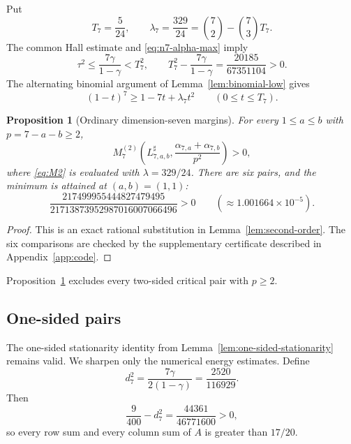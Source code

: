 \documentclass[11pt,a4paper]{article}
\numberwithin{equation}{section}
\newtheorem{proposition}[theorem]{Proposition}
\theoremstyle{definition}
\newcommand{\1}{\mathbf{1}}
\begin{document}
Put
\begin{equation}\label{eq:n7-ordinary-parameters}
 T_7=\frac5{24},
 \qquad
 \lambda_7=\frac{329}{24}
 =\binom72-\binom73T_7.
\end{equation}
The common Hall estimate and \eqref{eq:n7-alpha-max} imply
\begin{equation}\label{eq:n7-ordinary-range}
 \tau^2\le\frac{7\gamma}{1-\gamma}<T_7^2,
 \qquad
 T_7^2-\frac{7\gamma}{1-\gamma}
 =\frac{20185}{67351104}>0.
\end{equation}
The alternating binomial argument of Lemma~\ref{lem:binomial-low} gives
\begin{equation}\label{eq:n7-ordinary-binomial}
 (1-t)^7\ge1-7t+\lambda_7t^2
 \qquad(0\le t\le T_7).
\end{equation}

\begin{proposition}[Ordinary dimension-seven margins]\label{prop:n7-ordinary}
For every $1\le a\le b$ with $p=7-a-b\ge2$,
\[
 M_7^{(2)}\left(L^{\sharp}_{7,a,b},
 \frac{\alpha_{7,a}+\alpha_{7,b}}{p^2}\right)>0,
\]
where \eqref{eq:M2} is evaluated with $\lambda=329/24$.
There are six pairs, and the minimum is attained at $(a,b)=(1,1)$:
\begin{equation}\label{eq:n7-ordinary-minimum}
 \frac{217499955444827479495}
 {21713873952987016007066496}>0
 \qquad(\approx1.001664\times10^{-5}).
\end{equation}
\end{proposition}

\begin{proof}
This is an exact rational substitution in Lemma~\ref{lem:second-order}.
The six comparisons are checked by the supplementary certificate described in
Appendix~\ref{app:code}.
\end{proof}

Proposition~\ref{prop:n7-ordinary} excludes every two-sided critical pair
with $p\ge2$.

\subsection{One-sided pairs}

The one-sided stationarity identity from
Lemma~\ref{lem:one-sided-stationarity} remains valid.  We sharpen only the
numerical energy estimates.  Define
\[
 d_7^2=\frac{7\gamma}{2(1-\gamma)}=\frac{2520}{116929}.
\]
Then
\begin{equation}\label{eq:n7-d7-gap}
 \frac9{400}-d_7^2=\frac{44361}{46771600}>0,
\end{equation}
so every row sum and every column sum of $A$ is greater than $17/20$.
\end{document}
